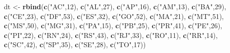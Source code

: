 \documentclass[
]{article}
\newenvironment{Shaded}{\begin{snugshade}}{\end{snugshade}}
\newcommand{\DataTypeTok}[1]{\textcolor[rgb]{0.13,0.29,0.53}{#1}}
\newcommand{\DecValTok}[1]{\textcolor[rgb]{0.00,0.00,0.81}{#1}}
\newcommand{\KeywordTok}[1]{\textcolor[rgb]{0.13,0.29,0.53}{\textbf{#1}}}
\newcommand{\NormalTok}[1]{#1}
\newcommand{\OperatorTok}[1]{\textcolor[rgb]{0.81,0.36,0.00}{\textbf{#1}}}
\newcommand{\StringTok}[1]{\textcolor[rgb]{0.31,0.60,0.02}{#1}}
\begin{document}
\begin{Shaded}
\begin{Highlighting}[]
{{\NormalTok{dt <-}\StringTok{ }\KeywordTok{rbind}\NormalTok{(}\KeywordTok{c}\NormalTok{(}\StringTok{"AC"}\NormalTok{,}\DecValTok{12}\NormalTok{), }\KeywordTok{c}\NormalTok{(}\StringTok{"AL"}\NormalTok{,}\DecValTok{27}\NormalTok{), }\KeywordTok{c}\NormalTok{(}\StringTok{"AP"}\NormalTok{,}\DecValTok{16}\NormalTok{), }\KeywordTok{c}\NormalTok{(}\StringTok{"AM"}\NormalTok{,}\DecValTok{13}\NormalTok{), }\KeywordTok{c}\NormalTok{(}\StringTok{"BA"}\NormalTok{,}\DecValTok{29}\NormalTok{), }
              \KeywordTok{c}\NormalTok{(}\StringTok{"CE"}\NormalTok{,}\DecValTok{23}\NormalTok{), }\KeywordTok{c}\NormalTok{(}\StringTok{"DF"}\NormalTok{,}\DecValTok{53}\NormalTok{), }\KeywordTok{c}\NormalTok{(}\StringTok{"ES"}\NormalTok{,}\DecValTok{32}\NormalTok{), }\KeywordTok{c}\NormalTok{(}\StringTok{"GO"}\NormalTok{,}\DecValTok{52}\NormalTok{), }\KeywordTok{c}\NormalTok{(}\StringTok{"MA"}\NormalTok{,}\DecValTok{21}\NormalTok{), }
              \KeywordTok{c}\NormalTok{(}\StringTok{"MT"}\NormalTok{,}\DecValTok{51}\NormalTok{), }\KeywordTok{c}\NormalTok{(}\StringTok{"MS"}\NormalTok{,}\DecValTok{50}\NormalTok{), }\KeywordTok{c}\NormalTok{(}\StringTok{"MG"}\NormalTok{,}\DecValTok{31}\NormalTok{), }\KeywordTok{c}\NormalTok{(}\StringTok{"PA"}\NormalTok{,}\DecValTok{15}\NormalTok{), }\KeywordTok{c}\NormalTok{(}\StringTok{"PB"}\NormalTok{,}\DecValTok{25}\NormalTok{), }
              \KeywordTok{c}\NormalTok{(}\StringTok{"PR"}\NormalTok{,}\DecValTok{41}\NormalTok{), }\KeywordTok{c}\NormalTok{(}\StringTok{"PE"}\NormalTok{,}\DecValTok{26}\NormalTok{), }\KeywordTok{c}\NormalTok{(}\StringTok{"PI"}\NormalTok{,}\DecValTok{22}\NormalTok{), }\KeywordTok{c}\NormalTok{(}\StringTok{"RN"}\NormalTok{,}\DecValTok{24}\NormalTok{), }\KeywordTok{c}\NormalTok{(}\StringTok{"RS"}\NormalTok{,}\DecValTok{43}\NormalTok{), }
              \KeywordTok{c}\NormalTok{(}\StringTok{"RJ"}\NormalTok{,}\DecValTok{33}\NormalTok{), }\KeywordTok{c}\NormalTok{(}\StringTok{"RO"}\NormalTok{,}\DecValTok{11}\NormalTok{), }\KeywordTok{c}\NormalTok{(}\StringTok{"RR"}\NormalTok{,}\DecValTok{14}\NormalTok{), }\KeywordTok{c}\NormalTok{(}\StringTok{"SC"}\NormalTok{,}\DecValTok{42}\NormalTok{), }\KeywordTok{c}\NormalTok{(}\StringTok{"SP"}\NormalTok{,}\DecValTok{35}\NormalTok{), }
              \KeywordTok{c}\NormalTok{(}\StringTok{"SE"}\NormalTok{,}\DecValTok{28}\NormalTok{), }\KeywordTok{c}\NormalTok{(}\StringTok{"TO"}\NormalTok{,}\DecValTok{17}\NormalTok{)) }\OperatorTok{%>%}\StringTok{ }\NormalTok{data.table }\OperatorTok{%>%}\StringTok{ `}\DataTypeTok{colnames<-}\StringTok{`}\NormalTok{(}\KeywordTok{c}\NormalTok{(}\StringTok{"uf"}\NormalTok{,}\StringTok{"id"}\NormalTok{))}
}}}
\end{Highlighting}
\end{Shaded}
\end{document}
